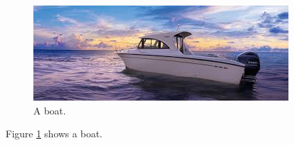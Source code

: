 \documentclass{article}
\begin{document}
\begin{figure}
   \includegraphics[width=\linewidth]{resources/boat.jpeg}
   \caption{A boat.}
   \label{fig:boat1} %
\end{figure}

Figure \ref{fig:boat1} shows a boat. %
\end{document}
